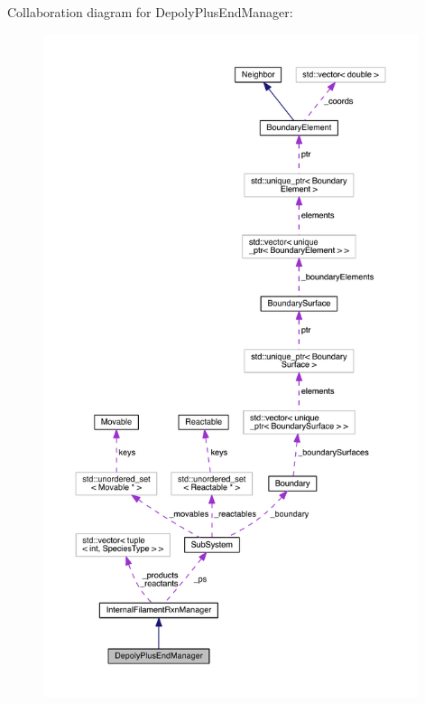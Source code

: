 Collaboration diagram for Depoly\+Plus\+End\+Manager\+:\nopagebreak
\begin{figure}[H]
\begin{center}
\leavevmode
\includegraphics[height=550pt]{classDepolyPlusEndManager__coll__graph}
\end{center}
\end{figure}
